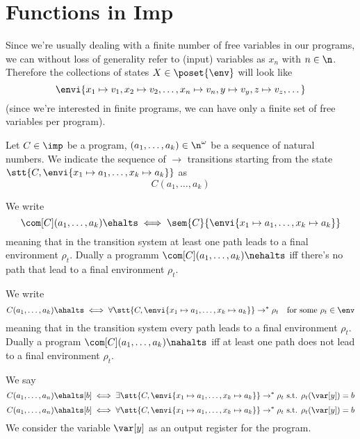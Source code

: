\section{Functions in Imp}
Since we're usually dealing with a finite number of free variables in
our programs, we can without loss of generality refer to (input)
variables as \(x_n\) with \(n\in\n\). Therefore the collections of
states \(X\in\poset{\env}\) will look like \[\envi{x_1\mapsto v_1, x_2
  \mapsto v_2, \dots, x_n\mapsto v_n, y \mapsto v_y, z \mapsto v_z,
  \dots}\] (since we're interested in finite programs, we can have
only a finite set of free variables per program).

\begin{notation}
  Let \(C\in\imp\) be a program, \((a_1, \dots, a_k) \in \n^\omega\)
  be a sequence of natural numbers. We indicate the sequence of
  \(\to\) transitions starting from the state
  \(\stt{C,\envi{x_1\mapsto a_1, \dots, x_k\mapsto a_k}}\) as \[C(a_1,
  \dots, a_k)\]
\end{notation}

\begin{notation}
  We write \[\com[C](a_1, \dots, a_k) \ehalts \iff \sem{C}\{\envi{x_1
    \mapsto a_1, \dots, x_k \mapsto a_k}\}\] meaning that in the
  transition system at least one path leads to a final environment
  \(\rho_t\). Dually a programm \(\com[C](a_1, \dots, a_k) \nehalts\)
  iff there's no path that lead to a final environment \(\rho_t\).
\end{notation}

\begin{notation}
  We write \[C(a_1, \dots, a_k) \ahalts \iff \forall \stt{C, \envi{x_1
      \mapsto a_1, \dots, x_k \mapsto a_k}} \to^* \rho_t \quad
  \text{for some } \rho_t\in \env\] meaning that in the transition
  system every path leads to a final environment \(\rho_t\). Dually a
  program \(\com[C](a_1, \dots, a_k) \nahalts\) iff at least one path
  does not lead to a final environment \(\rho_t\).
\end{notation}

\begin{notation}
  We say \[C(a_1,\dots, a_n)\ehalts[b] \iff \exists \stt{C, \envi{x_1
      \mapsto a_1, \dots, x_k \mapsto a_k}} \to^* \rho_t \text{ s.t. }
  \rho_t(\var[y]) = b\] \[C(a_1,\dots, a_n)\ahalts[b] \iff \forall
  \stt{C, \envi{x_1 \mapsto a_1, \dots, x_k \mapsto a_k}} \to^* \rho_t
  \text{ s.t. } \rho_t(\var[y]) = b\]We consider the variable
  \(\var[y]\) as an output register for the program.
\end{notation}

